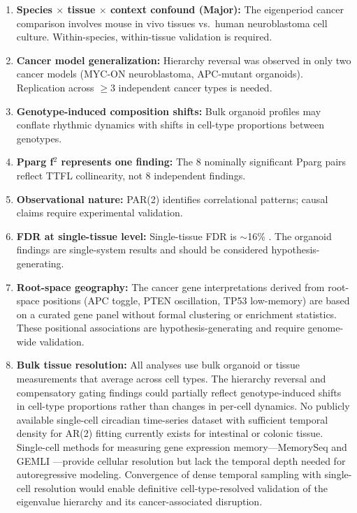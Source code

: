 \documentclass[11pt,letterpaper]{article}
\begin{document}
\begin{enumerate}[noitemsep]
    \item \textbf{Species $\times$ tissue $\times$ context confound (Major):} The eigenperiod cancer comparison involves mouse in vivo tissues vs.\ human neuroblastoma cell culture. Within-species, within-tissue validation is required.
    \item \textbf{Cancer model generalization:} Hierarchy reversal was observed in only two cancer models (MYC-ON neuroblastoma, APC-mutant organoids). Replication across $\geq$3 independent cancer types is needed.
    \item \textbf{Genotype-induced composition shifts:} Bulk organoid profiles may conflate rhythmic dynamics with shifts in cell-type proportions between genotypes.
    \item \textbf{Pparg f$^2$ represents one finding:} The 8 nominally significant Pparg pairs reflect TTFL collinearity, not 8 independent findings.
    \item \textbf{Observational nature:} PAR(2) identifies correlational patterns; causal claims require experimental validation.
    \item \textbf{FDR at single-tissue level:} Single-tissue FDR is $\sim$16\% \citep{whiteside2026paper1}. The organoid findings are single-system results and should be considered hypothesis-generating.
    \item \textbf{Root-space geography:} The cancer gene interpretations derived from root-space positions (APC toggle, PTEN oscillation, TP53 low-memory) are based on a curated gene panel without formal clustering or enrichment statistics. These positional associations are hypothesis-generating and require genome-wide validation.
    \item \textbf{Bulk tissue resolution:} All analyses use bulk organoid or tissue measurements that average across cell types. The hierarchy reversal and compensatory gating findings could partially reflect genotype-induced shifts in cell-type proportions rather than changes in per-cell dynamics. No publicly available single-cell circadian time-series dataset with sufficient temporal density for AR(2) fitting currently exists for intestinal or colonic tissue. Single-cell methods for measuring gene expression memory---MemorySeq \citep{raj2020memoryseq} and GEMLI \citep{eisele2024gemli}---provide cellular resolution but lack the temporal depth needed for autoregressive modeling. Convergence of dense temporal sampling with single-cell resolution would enable definitive cell-type-resolved validation of the eigenvalue hierarchy and its cancer-associated disruption.
\end{enumerate}
\end{document}

